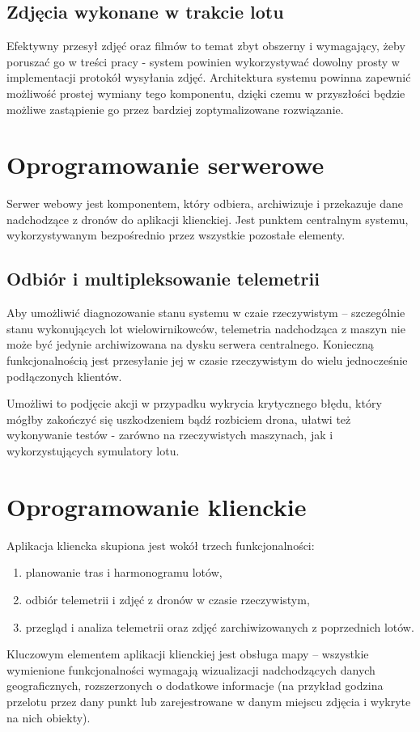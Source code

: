 \subsection{Zdjęcia wykonane w trakcie lotu}
Efektywny przesył zdjęć oraz filmów to temat zbyt obszerny
i wymagający, żeby poruszać go w treści pracy - system
powinien wykorzystywać dowolny prosty w implementacji
protokół wysyłania zdjęć. Architektura systemu powinna
zapewnić możliwość prostej wymiany tego komponentu, dzięki
czemu w przyszłości będzie możliwe zastąpienie go
przez bardziej zoptymalizowane rozwiązanie.

\section{Oprogramowanie serwerowe}

Serwer webowy jest komponentem, który odbiera, archiwizuje i przekazuje
dane nadchodzące z dronów do aplikacji klienckiej. Jest punktem centralnym systemu,
wykorzystywanym bezpośrednio przez wszystkie pozostałe elementy.

\subsection{Odbiór i multipleksowanie telemetrii}

Aby umożliwić diagnozowanie stanu systemu w czaie rzeczywistym -- szczególnie
stanu wykonujących lot wielowirnikowców, telemetria nadchodząca z maszyn nie może być
jedynie archiwizowana na dysku serwera centralnego. Konieczną funkcjonalnością jest
przesyłanie jej w czasie rzeczywistym do wielu jednocześnie podłączonych klientów.

Umożliwi to podjęcie akcji w przypadku wykrycia krytycznego błędu, który mógłby
zakończyć się uszkodzeniem bądź rozbiciem drona, ułatwi też wykonywanie testów - zarówno
na rzeczywistych maszynach, jak i wykorzystujących symulatory lotu.

\section{Oprogramowanie klienckie}

Aplikacja kliencka skupiona jest wokół trzech funkcjonalności:

\begin{enumerate}
    \item planowanie tras i harmonogramu lotów,
    \item odbiór telemetrii i zdjęć z dronów w czasie rzeczywistym,
    \item przegląd i analiza telemetrii oraz zdjęć zarchiwizowanych z poprzednich lotów.
\end{enumerate}

Kluczowym elementem aplikacji klienckiej jest obsługa mapy -- wszystkie
wymienione funkcjonalności wymagają wizualizacji nadchodzących danych geograficznych,
rozszerzonych o dodatkowe informacje (na przykład godzina przelotu przez dany punkt lub
zarejestrowane w danym miejscu zdjęcia i wykryte na nich obiekty).